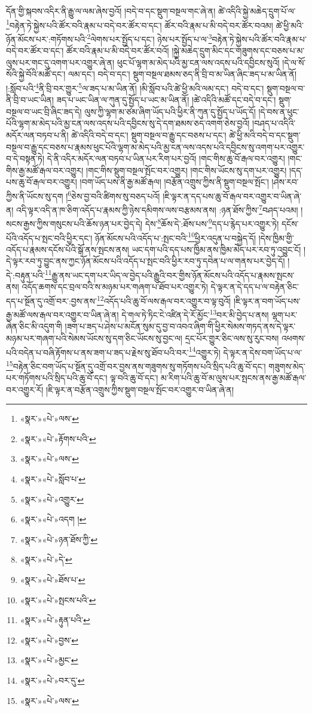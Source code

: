 དོན་གྱི་སྐབས་འདིར་ནི་རྒྱུ་ལ་ལམ་ཞེས་བྱའོ། །བདེ་བ་དང་སྡུག་བསྔལ་གང་ཞེ་ན། ཚེ་འདིའི་སྐྱེ་མཆེད་དྲུག་པོ་ལ་\footnote{«སྣར་»«པེ་»ལས་}བརྟེན་ཏེ་སྐྱེས་པའི་ཚོར་བའི་རྣམ་པ་བདེ་བར་ཚོར་བ་དང་། ཚོར་བའི་རྣམ་པ་མི་བདེ་བར་ཚོར་བའམ། ཚེ་ཕྱི་མའི་ཉོན་མོངས་པར་:གཏོགས་པའི་\footnote{«སྣར་»«པེ་»རྟོགས་པའི་}ལེགས་པར་སྤྱོད་པ་དང་། ཉེས་པར་སྤྱོད་པ་ལ་\footnote{«སྣར་»«པེ་»ལས་}བརྟེན་ཏེ་སྐྱེས་པའི་ཚོར་བའི་རྣམ་པ་བདེ་བར་ཚོར་བ་དང་། ཚོར་བའི་རྣམ་པ་མི་བདེ་བར་ཚོར་བའོ། །སྐྱེ་མཆེད་དྲུག་མིང་དང་གཟུགས་དང་བཅས་པ་མ་ལུས་པར་གང་དུ་འགག་པར་འགྱུར་ཞེ་ན། ཕུང་པོ་ལྷག་མ་མེད་པའི་མྱ་ངན་ལས་འདས་པའི་དབྱིངས་སུའོ། །དེ་ལ་སོ་སོའི་སྐྱེ་བོའི་མཚོ་དང་། ལམ་དང་། བདེ་བ་དང་། སྡུག་བསྔལ་ཐམས་ཅད་ནི་བྲི་བ་མ་ཡིན་ཞིང་ཟད་པ་མ་ཡིན་ནོ། །:སློབ་པའི་\footnote{«སྣར་»«པེ་»སློབ་པ་}ནི་བྲི་བར་གྱུར་\footnote{«སྣར་»«པེ་»འགྱུར་}ལ་ཟད་པ་མ་ཡིན་ནོ། །མི་སློབ་པའི་ཚེ་ཕྱི་མའི་ལམ་དང་། བདེ་བ་དང་། སྡུག་བསྔལ་བ་ནི་བྲི་བ་ཡང་ཡིན། ཟད་པ་ཡང་ཡིན་ལ་ཀུན་དུ་སྤྱོད་པ་ཡང་མ་ཡིན་ནོ། །ཚེ་འདིའི་མཚོ་དང་བདེ་བ་དང་། སྡུག་བསྔལ་བ་ཡང་བྲི་ཞིང་ཟད་དེ། ལུས་ཀྱི་ལྷག་མ་ཙམ་ཞིག་ཡོད་པའི་ཕྱིར་ནི་ཀུན་དུ་སྤྱོད་པ་ཡོད་དོ། །དེ་བས་ན་ཕུང་པོའི་ལྷག་མ་མེད་པའི་མྱ་ངན་ལས་འདས་པའི་དབྱིངས་སུ་དེ་དག་ཐམས་ཅད་འགག་ཅེས་བྱའོ། །བཤད་པ་འདིའི་མདོར་ལན་བཏབ་པ་ནི། ཚེ་འདིའི་བདེ་བ་དང་། སྡུག་བསྔལ་བ་རྒྱུ་དང་བཅས་པ་དང་། ཚེ་ཕྱི་མའི་བདེ་བ་དང་སྡུག་བསྔལ་བ་རྒྱུ་དང་བཅས་པ་རྣམས་ཕུང་པོའི་ལྷག་མ་མེད་པའི་མྱ་ངན་ལས་འདས་པའི་དབྱིངས་སུ་འགག་པར་འགྱུར་བ་དེ་བསྟན་ཏེ། དེ་ནི་འདིར་མདོར་ལན་བཏབ་པ་ཡིན་པར་རིག་པར་བྱའོ། །གང་གིས་ཆུ་བོ་རྒལ་བར་འགྱུར། །གང་གིས་རྒྱ་མཚོ་རྒལ་བར་འགྱུར། །གང་གིས་སྡུག་བསྔལ་སྤོང་བར་འགྱུར། །གང་གིས་ཡོངས་སུ་དག་པར་འགྱུར། །དད་པས་ཆུ་བོ་རྒལ་བར་འགྱུར། །བག་ཡོད་པས་ནི་རྒྱ་མཚོ་རྒལ། །བརྩོན་འགྲུས་ཀྱིས་ནི་སྡུག་བསྔལ་སྤོང་། །ཤེས་རབ་ཀྱིས་ནི་ཡོངས་སུ་དག །\footnote{«སྣར་»«པེ་»འདག །}ཅེས་བྱ་བའི་ཚིགས་སུ་བཅད་པའོ། །ཇི་ལྟར་ན་དད་པས་ཆུ་བོ་རྒལ་བར་འགྱུར་བ་ཡིན་ཞེ་ན། འདི་ལྟར་འདི་ན་ཁ་ཅིག་འདོད་པ་རྣམས་ཀྱི་ཉེས་དམིགས་ལས་བརྩམས་ནས། :ཉན་ཐོས་ཀྱིས་\footnote{«སྣར་»«པེ་»ཉན་ཐོས་ཀྱི་}བཤད་པའམ། །སངས་རྒྱས་ཀྱིས་གསུངས་པའི་ཆོས་ཉན་པར་བྱེད་དེ། དེས་\footnote{«སྣར་»«པེ་»དེ་}ཆོས་དེ་:ཐོས་པས་\footnote{«སྣར་»«པེ་»ཐོས་པ་}དད་པ་རྙེད་པར་འགྱུར་ཏེ། དངོས་པོའི་འདོད་པ་སྤང་བའི་ཕྱིར་དང་། ཉོན་མོངས་པའི་འདོད་པ་:སྤང་བའི་\footnote{«སྣར་»«པེ་»སྤངས་པའི་}ཕྱིར་འདུན་པ་བསྐྱེད་དོ། །དེས་ཁྱིམ་གྱི་འདོད་པ་རྣམས་དངོས་པོའི་སྒོ་ནས་སྤངས་ནས། ཡང་དག་པའི་དད་པས་ཁྱིམ་ནས་ཁྱིམ་མེད་པར་རབ་ཏུ་འབྱུང་ངོ། །དེ་ལྟར་རབ་ཏུ་བྱུང་ནས་ཀྱང་ཉོན་མོངས་པའི་འདོད་པ་སྤང་བའི་ཕྱིར་རབ་ཏུ་དབེན་པ་ལ་གནས་པར་བྱེད་དོ། །དེ་:བརྟུན་པའི་\footnote{«སྣར་»«པེ་»རྟུན་པའི་}རྒྱུ་ནས་ཡང་དག་པར་ཡིད་ལ་བྱེད་པའི་རྒྱུའི་བར་གྱིས་ཉོན་མོངས་པའི་འདོད་པ་རྣམས་སྤངས་ནས། འདོད་ཆགས་དང་བྲལ་བའི་ས་མཉམ་པར་གཞག་པ་ཐོབ་པར་འགྱུར་ཏེ། དེ་ལྟར་ན་དེ་དད་པ་ལ་བརྟེན་ཅིང་དད་པ་སྔོན་དུ་འགྲོ་བར་:བྱས་ནས་\footnote{«སྣར་»«པེ་»བྱས་}འདོད་པའི་ཆུ་བོ་ལས་རྒལ་བར་འགྱུར་བ་ལྟ་བུའོ། །ཇི་ལྟར་ན་བག་ཡོད་པས་རྒྱ་མཚོ་ལས་རྒལ་བར་འགྱུར་བ་ཡིན་ཞེ་ན། དེ་གལ་ཏེ་ཏིང་ངེ་འཛིན་དེ་རོ་མྱོང་\footnote{«སྣར་»«པེ་»མྱང་}བར་མི་བྱེད་པ་ནས། ལྷག་པར་ཞེན་ཅིང་མི་འདུག་གི །ཟག་པ་ཟད་པ་ཤེས་པ་མངོན་སུམ་དུ་བྱ་བ་འབའ་ཞིག་གི་ཕྱིར་སེམས་གཏད་ནས་དེ་ལྟར་མཉམ་པར་གཞག་པའི་སེམས་ཡོངས་སུ་དག་ཅིང་ཡོངས་སུ་བྱང་ལ། དྲང་པོར་གྱུར་ཅིང་ལས་སུ་རུང་བས། འཕགས་པའི་བདེན་པ་བཞི་རྟོགས་པ་ནས་ཟག་པ་ཟད་པ་རྗེས་སུ་ཐོབ་པའི་བར་\footnote{«སྣར་»«པེ་»བར་དུ་}འགྱུར་ཏེ། དེ་ལྟར་ན་དེས་བག་ཡོད་པ་ལ་\footnote{«སྣར་»«པེ་»ལས་}བརྟེན་ཅིང་བག་ཡོད་པ་སྔོན་དུ་འགྲོ་བར་བྱས་ནས་གཟུགས་སུ་གཏོགས་པའི་སྲིད་པའི་ཆུ་བོ་དང་། གཟུགས་མེད་པར་གཏོགས་པའི་སྲིད་པའི་ཆུ་བོ་དང་། ལྟ་བའི་ཆུ་བོ་དང་། མ་རིག་པའི་ཆུ་བོ་མ་ལུས་པར་སྤངས་ནས་རྒྱ་མཚོ་རྒལ་བར་འགྱུར་རོ། །ཇི་ལྟར་ན་བརྩོན་འགྲུས་ཀྱིས་སྡུག་བསྔལ་སྤོང་བར་འགྱུར་བ་ཡིན་ཞེ་ན། 